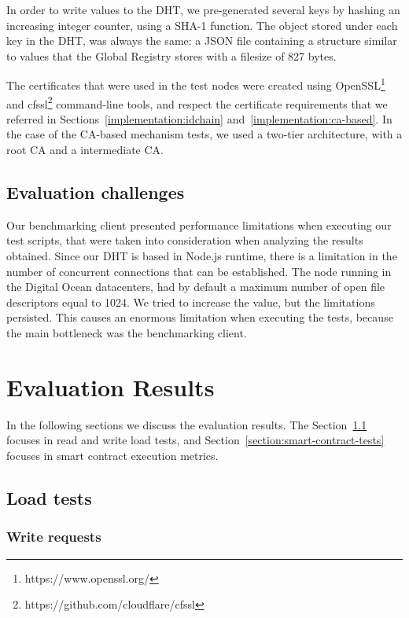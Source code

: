 In order to write values to the DHT, we pre-generated several keys by hashing an increasing integer counter, using a SHA-1 function.
The object stored under each key in the DHT, was always the same: a JSON file containing a structure similar to values that the Global Registry stores with a filesize of 827 bytes.

The certificates that were used in the test nodes were created using OpenSSL\footnote{https://www.openssl.org/} and cfssl\footnote{https://github.com/cloudflare/cfssl} command-line tools, and respect the certificate requirements that we referred in Sections~\ref{implementation:idchain} and~\ref{implementation:ca-based}.
In the case of the CA-based mechanism tests, we used a two-tier architecture, with a root CA and a intermediate CA.

\subsection{Evaluation challenges}

Our benchmarking client presented performance limitations when executing our test scripts, that were taken into consideration when analyzing the results obtained.
Since our DHT is based in Node.js runtime, there is a limitation in the number of concurrent connections that can be established.
The node running in the Digital Ocean datacenters, had by default a maximum number of open file descriptors equal to 1024.
We tried to increase the value, but the limitations persisted.
This causes an enormous limitation when executing the tests, because the main bottleneck was the benchmarking client.

\section{Evaluation Results}
\label{section:results}
In the following sections we discuss the evaluation results.
The Section~\ref{section:load-tests} focuses in read and write load tests, and Section~\ref{section:smart-contract-tests} focuses in smart contract execution metrics.

\subsection{Load tests}
\label{section:load-tests}

\subsubsection{Write requests}

